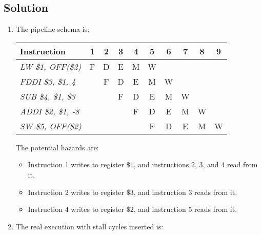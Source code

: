\subsection{Solution}
\begin{enumerate}
    \item The pipeline schema is:
        \begin{table}[H]
            \centering
            \begin{tabular}{l|ccccccccc}
            \textbf{Instruction}     & \textbf{1} & \textbf{2} & \textbf{3} & \textbf{4} & \textbf{5} & \textbf{6} & \textbf{7} & \textbf{8} & \textbf{9} \\ \hline
            \textit{LW \$1, OFF(\$2)}  & F          & D          & E          & M          & W          &            &            &            &            \\
            \textit{FDDI \$3, \$1, 4}  &            & F          & D          & E          & M          & W          &            &            &            \\
            \textit{SUB \$4, \$1, \$3} &            &            & F          & D          & E          & M          & W          &            &            \\
            \textit{ADDI \$2, \$1, -8} &            &            &            & F          & D          & E          & M          & W          &            \\
            \textit{SW \$5, OFF(\$2)}  &            &            &            &            & F          & D          & E          & M          & W         
            \end{tabular}
        \end{table}
        The potential hazards are:
        \begin{itemize}
            \item Instruction 1 writes to register $\$1$, and instructions 2, 3, and 4 read from it.
            \item Instruction 2 writes to register $\$3$, and instruction 3 reads from it.
            \item Instruction 4 writes to register $\$2$, and instruction 5 reads from it.
        \end{itemize}
    \item The real execution with stall cycles inserted is:
        \begin{table}[H]
            \centering
            \begin{tabular}{l|ccccccccccccccc}

\end{tabular}
\end{table}
\end{enumerate}
